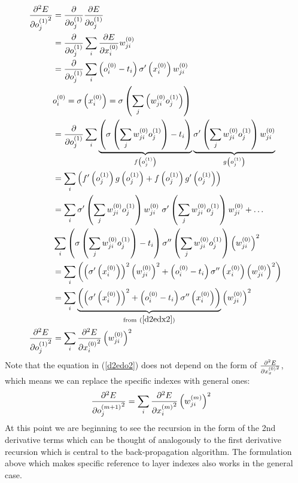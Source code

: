 \begin{align}
\pdv[2]{E}{{o_{j}^{(1)}}} &= 
\pdv{}{o_{j}^{(1)}}
\pdv{E}{o_{j}^{(1)}}
\\
&= \pdv{}{o_{j}^{(1)}}
\sum_i\pdv{E}{x_{i}^{(0)}}w_{ji}^{(0)}
\\
&= \pdv{}{o_{j}^{(1)}}
\sum_i
\left(o_{i}^{(0)} - t_{i}\right)\sigma^{\prime}\left(x_{i}^{(0)}\right)w_{ji}^{(0)}
\\
&{o_{i}^{(0)}} = \sigma\left({x_{i}^{(0)}}\right) = \sigma\left(\sum_j\left({w_{ji}^{(0)}}{o_{j}^{(1)}}\right)\right)
\\
&= \pdv{}{o_{j}^{(1)}}
\sum_i
\underbrace{\left(\sigma\left(\sum_j{w_{ji}^{(0)}}{o_{j}^{(1)}}\right) - t_{i}\right)}
_{f\left(o_{j}^{(1)}\right)}
\underbrace{\sigma^{\prime}\left(\sum_j{w_{ji}^{(0)}}{o_{j}^{(1)}}\right)w_{ji}^{(0)}}
_{g\left(o_{j}^{(1)}\right)}
\\
&=\sum_i\left(f^{\prime}\left(o_{j}^{(1)}\right)g\left(o_{j}^{(1)}\right) + f\left(o_{j}^{(1)}\right)g^{\prime}\left(o_{j}^{(1)}\right)\right)
\\
&=\sum_i
\sigma^{\prime}\left(\sum_j{w_{ji}^{(0)}}{o_{j}^{(1)}}\right)w_{ji}^{(0)} \
\sigma^{\prime}\left(\sum_j{w_{ji}^{(0)}}{o_{j}^{(1)}}\right)w_{ji}^{(0)}
+ \ldots \\
&\sum_i
\left(\sigma\left(\sum_j{w_{ji}^{(0)}}{o_{j}^{(1)}}\right) - t_{i}\right)
\sigma^{\prime\prime}\left(\sum_j{w_{ji}^{(0)}}{o_{j}^{(1)}}\right)\left(w_{ji}^{(0)}\right)^2
\\
&=
\sum_i\left(
\left(\sigma^{\prime}\left(x_{i}^{(0)}\right)\right)^2\left({w_{ji}^{(0)}}\right)^2
+ 
\left(o_{i}^{(0)} - t_{i}\right)
\sigma^{\prime\prime}\left(x_{i}^{(0)}\right)\left({w_{ji}^{(0)}}\right)^2
\right)
\\
&=\sum_i
\underbrace{\left(\left(\sigma^{\prime}\left(x_{i}^{(0)}\right)\right)^2
+ 
\left(o_{i}^{(0)} - t_{i}\right)
\sigma^{\prime\prime}\left(x_{i}^{(0)}\right)\right)}
_{\text{from} \ (\ref{d2edx2})}
\left({w_{ji}^{(0)}}\right)^2
\\
\pdv[2]{E}{{o_{j}^{(1)}}} &= 
\sum_i\pdv[2]{E}{{x_{i}^{(0)}}} \left({w_{ji}^{(0)}}\right)^2\label{d2edo2}
\end{align}
Note that the equation in (\ref{d2edo2}) does not depend on the form of $\pdv[2]{E}{{x_{x}^{(0)}}}$, which means we can replace the specific indexes with general ones:
\begin{align}
\pdv[2]{E}{{o_{j}^{(m+1)}}} &= \sum_i
\pdv[2]{E}{{x_{i}^{(m)}}} \left({w_{ji}^{(m)}}\right)^2\label{de2do2_general}
\end{align} 
At this point we are beginning to see the recursion in the form of the 2nd derivative terms which can be thought of analogously to the first derivative recursion which is central to the back-propagation algorithm. The formulation above which makes specific reference to layer indexes also works in the general case.
